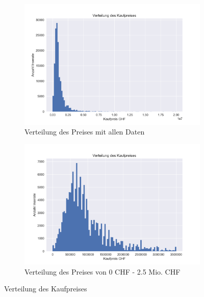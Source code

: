\begin{figure}[ht]
\begin{subfigure}{.5\textwidth}
  \centering
  \includegraphics[width=\linewidth]{images/bar_des_kauf_preises.png}
  \caption[Verteilung des Preises mit allen Daten]{Verteilung des Preises mit allen Daten\\}
  \label{fig:verteilung_price_all}
\end{subfigure}
\begin{subfigure}{.5\textwidth}
  \centering
  \includegraphics[width=\linewidth]{images/bar_des_kauf_preises_cut.png}
  \caption[Verteilung des Preises von 0 CHF - 2.5 Mio. CHF]{Verteilung des Preises von 0 CHF - 2.5 Mio. CHF}
  \label{fig:verteilung_price_part}
\end{subfigure}
\caption[Verteilung des Kaufpreises]{Verteilung des Kaufpreises}
\label{fig:price}
\end{figure}

